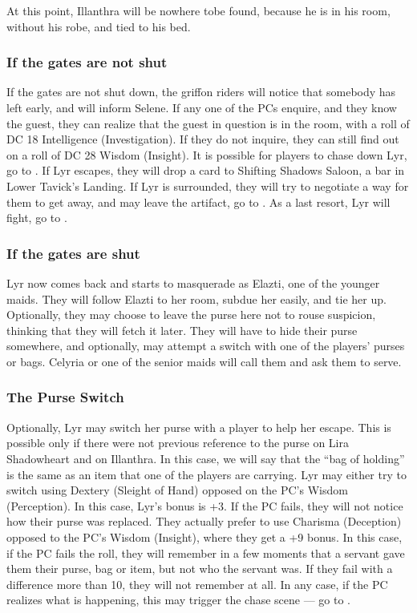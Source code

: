 \documentclass[twocolumn]{dndbook}
\begin{document}
At this point, Illanthra will be nowhere tobe found, because he is in his room, without his robe, and tied to his bed.


\subsubsection*{If the gates are not shut}
If the gates are not shut down, the griffon riders will notice that somebody has left early, and will inform Selene.
If any one of the PCs enquire, and they know the guest, they can realize that the guest in question is in the room, with a roll of DC 18 Intelligence (Investigation).
If they do not inquire, they can still find out on a roll of DC 28 Wisdom (Insight).
It is possible for players to chase down Lyr, go to .
If Lyr escapes, they will drop a card to Shifting Shadows Saloon, a bar in Lower Tavick's Landing.
If Lyr is surrounded, they will try to negotiate a way for them to get away, and may leave the artifact, go to .
As a last resort, Lyr will fight, go to .

\subsubsection*{If the gates are shut}
Lyr now comes back and starts to masquerade as Elazti, one of the younger maids.
They will follow Elazti to her room, subdue her easily, and tie her up.
Optionally, they may choose to leave the purse here not to rouse suspicion, thinking that they will fetch it later.
They will have to hide their purse somewhere, and optionally, may attempt a switch with one of the players' purses or bags.
Celyria or one of the senior maids will call them and ask them to serve.



\subsubsection*{The Purse Switch}

Optionally, Lyr may switch her purse with a player to help her escape.
This is possible only if there were not previous reference to the purse on Lira Shadowheart and on Illanthra.
In this case, we will say that the ``bag of holding'' is the same as an item that one of the players are carrying.
Lyr may either try to switch using Dextery (Sleight of Hand) opposed on the PC's Wisdom (Perception). In this case, Lyr's bonus is +3.
If the PC fails, they will not notice how their purse was replaced.
They actually prefer to use Charisma (Deception) opposed to the PC's Wisdom (Insight), where they get a +9 bonus.
In this case, if the PC fails the roll, they will remember in a few moments that a servant gave them their purse, bag or item, but not who the servant was.
If they fail with a difference more than 10, they will not remember at all.
In any case, if the PC realizes what is happening, this may trigger the chase scene --- go to .
\end{document}
